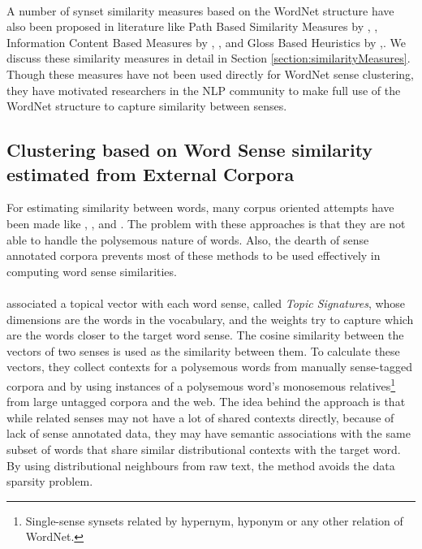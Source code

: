 \paragraph{}
A number of synset similarity measures based on the WordNet structure have also been proposed in literature like 
Path Based Similarity Measures by \citep{WuPalmer:1994}, \citep{LCH:1998}, Information Content Based Measures by \citep{Resnik:1995}, \citep{JCN:1997}, \citep{Lin:1998} and Gloss Based Heuristics by \citep{Lesk:1986},\citep{Banerjee:2002}. We discuss these similarity measures in detail in Section \ref{section:similarityMeasures}.
Though these measures have not been used directly for WordNet sense clustering, they have motivated researchers in the NLP community to make full use of the WordNet structure to capture similarity between senses.

\subsection{Clustering based on Word Sense similarity estimated from External Corpora}
For estimating similarity between words, many corpus oriented attempts have been made like \citep{Pereira:93a}, \citep{Lin:1998}, \citep{kolb2008disco} and \citep{agirre2009study}. The problem with these approaches is that they are not able to handle the polysemous nature of words. Also, the dearth of sense annotated corpora prevents most of these methods to be used effectively in computing word sense similarities.

\paragraph{}
\citep{agirre2003clustering} associated a topical vector with each word sense, called \textit{Topic Signatures}, whose dimensions are the words in the vocabulary, and the weights try to capture which are the words closer to the target word sense. The cosine similarity between the vectors of two senses is used as the similarity between them. To calculate these vectors, they collect contexts for a polysemous words from manually sense-tagged corpora and by using instances of a polysemous word's monosemous relatives\footnote{Single-sense synsets related by hypernym, hyponym or any other relation of WordNet.} from large untagged corpora and the web. The idea behind the approach is that while related senses may not have a lot of shared contexts directly, because of lack of sense annotated data, they may have semantic associations with the same subset of words that share similar distributional contexts with the target word. By using distributional neighbours from raw text, the method avoids the data sparsity problem.

